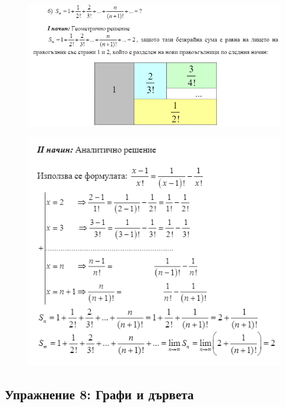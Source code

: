 \documentclass[fleqn, 12pt]{article}
\theoremstyle{definition}
\begin{document}
\begin{figure} [htp!]
\includegraphics{Pics/Discrete math/ex7/ex7-task6-7.png}
\end{figure}
\begin{figure} [htp!]
\includegraphics{Pics/Discrete math/ex7/ex7-task6-8.png}
\end{figure}

\newpage
\subsection{Упражнение 8: Графи и дървета}
\end{document}
